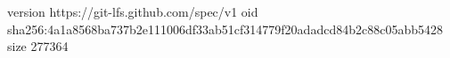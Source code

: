 version https://git-lfs.github.com/spec/v1
oid sha256:4a1a8568ba737b2e111006df33ab51cf314779f20adadcd84b2c88c05abb5428
size 277364
